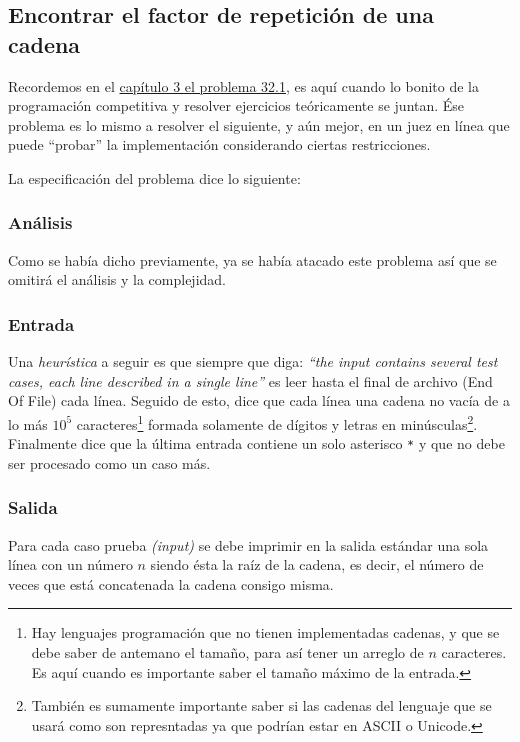 \subsection{Encontrar el factor de repetición de una cadena}
Recordemos en el \hyperlink{repetition_factor}{capítulo 3 el problema 32.1}, es aquí cuando lo
bonito de la programación competitiva y resolver ejercicios teóricamente se juntan. Ése problema
es lo mismo a resolver el siguiente, y aún mejor, en un juez en línea que puede ``probar'' la
implementación considerando ciertas restricciones.

La especificación del problema dice lo siguiente: 



\subsubsection{Análisis}
Como se había dicho previamente, ya se había atacado este problema así que se omitirá el análisis
y la complejidad.

\subsubsection{Entrada}
Una \textit{heurística} a seguir es que siempre que diga: \textit{``the input contains several test
cases, each line described in a single line''} es leer hasta el final de archivo (End Of File) cada
línea. Seguido de esto, dice que cada línea una cadena no vacía de a lo más $10^5$
caracteres\footnote{Hay lenguajes programación que no tienen implementadas cadenas, y que se debe
saber de antemano el tamaño, para así tener un arreglo de $n$ caracteres. Es aquí cuando es
importante saber el tamaño máximo de la entrada.} formada solamente de dígitos y letras en
minúsculas\footnote{También es sumamente importante saber si las cadenas del lenguaje que se usará
como son represntadas ya que podrían estar en ASCII o Unicode.}.
Finalmente dice que la última entrada contiene un solo asterisco \texttt{*} y que no debe ser
procesado como un caso más.

\subsubsection{Salida}
Para cada caso prueba \textit{(input)} se debe imprimir en la salida estándar una sola línea con un
número $n$ siendo ésta la raíz de la cadena, es decir, el número de veces que está concatenada la
cadena consigo misma.

